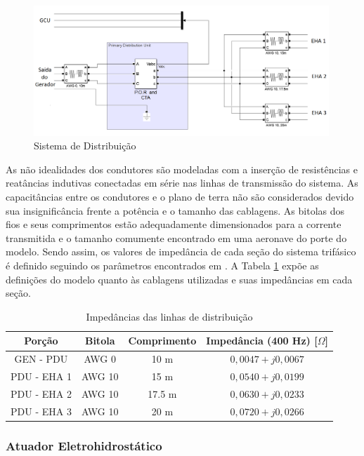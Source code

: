 \begin{figure}[!htb] %
	\centering
	\includegraphics[width=0.99\textwidth]{Cap4/Figuras/dist.png}
	\caption{Sistema de Distribuição}
	\label{fig:dist.png}
\end{figure}

As não idealidades dos condutores são modeladas com a inserção de resistências e reatâncias indutivas conectadas em série nas linhas de transmissão do sistema. As capacitâncias entre os condutores e o plano de terra não são considerados devido sua insignificância frente a potência e o tamanho das cablagens. As bitolas dos fios e seus comprimentos estão adequadamente dimensionados para a corrente transmitida e o tamanho comumente encontrado em uma aeronave do porte do modelo. Sendo assim, os valores de impedância de cada seção do sistema trifásico é definido seguindo os parâmetros encontrados em \cite{Exner1953}. A Tabela \ref{tab:Zdist} expõe as definições do modelo quanto às cablagens utilizadas e suas impedâncias em cada seção. 

\begin{table}[!htb]
	\centering
	\begin{tabular}{|c|c|c|c|}
		\hline
		\textbf{Porção}		&	\textbf{Bitola}		&	\textbf{Comprimento}	&	\textbf{Impedância (400 Hz) [$\Omega$]}	\\\hline
		GEN - PDU	&	AWG 0		&	10 m		&	$0,0047+j0,0067$	\\\hline
		PDU - EHA 1	&	AWG 10 		&	15 m		&	$0,0540+j0,0199$	\\\hline
		PDU - EHA 2 	&	AWG 10		&	17.5 m 		&	$0,0630+j0,0233$	\\\hline
		PDU - EHA 3	&	AWG 10		&	20 m 		&	$0,0720+j0,0266$	\\\hline
	\end{tabular}
	\caption{Impedâncias das linhas de distribuição}
	\label{tab:Zdist}
\end{table}

\subsubsection{Atuador Eletrohidrostático}

